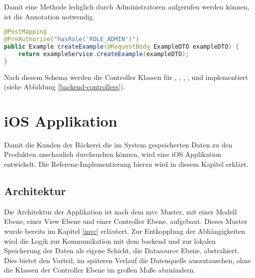 Damit eine Methode lediglich durch Administratoren aufgerufen werden können, ist die Annotation  notwendig.
\begin{lstlisting}[language=Java]
@PostMapping
@PreAuthorize("hasRole('ROLE_ADMIN')")
public Example createExample(@RequestBody ExampleDTO exampleDTO) {
	return exampleService.createExample(exampleDTO);
}
\end{lstlisting}

Nach diesem Schema werden die Controller Klassen für , , , ,  und  implementiert (siehe Abbildung \ref{backend-controllers}).

\clearpage


\clearpage

\section{iOS Applikation}
Damit die Kunden der Bäckerei die im System gespeicherten Daten zu den Produkten anschaulich durchsuchen können, wird eine iOS Applikation entwickelt.
Die Referenz-Implementierung hierzu wird in diesem Kapitel erklärt.

\subsection{Architektur}
Die Architektur der Applikation ist nach dem \gls{mvc} Muster, mit einer Modell Ebene, einer View Ebene und einer Controller Ebene, aufgebaut. Dieses Muster wurde bereits im Kapitel \ref{mvc} erläutert.
Zur Entkopplung der Abhängigkeiten wird die Logik zur Kommunikation mit dem \gls{backend} und zur lokalen Speicherung der Daten als eigene Schicht, die Datasource Ebene, abstrahiert.
Dies bietet den Vorteil, im späteren Verlauf die Datenquelle auszutauschen, ohne die Klassen der Controller Ebene im großen Maße abzuändern.

